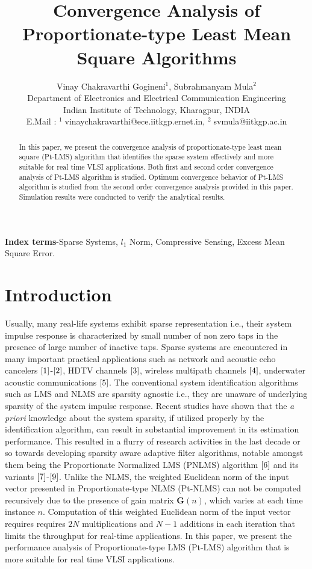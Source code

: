 \documentclass[journal, one column]{IEEEtran}
\begin{document}
\title{Convergence Analysis of Proportionate-type Least Mean Square Algorithms}


\author{{Vinay Chakravarthi Gogineni$^1$, Subrahmanyam Mula$^2$}\\
Department of Electronics and Electrical Communication Engineering\\
Indian Institute of Technology, Kharagpur, INDIA\\
E.Mail : $^1\;$vinaychakravarthi@ece.iitkgp.ernet.in, $^2\;$svmula@iitkgp.ac.in}

\maketitle
\thispagestyle{empty}

\begin{abstract}
In this paper, we present the convergence analysis of proportionate-type least mean square (Pt-LMS) algorithm that identifies the sparse system effectively and more suitable for real time VLSI applications. Both first and second order convergence analysis of Pt-LMS algorithm is studied. Optimum convergence behavior of Pt-LMS algorithm is studied from the second order convergence analysis provided in this paper. Simulation results were conducted to verify the analytical results.
\end{abstract}
\textbf{Index terms}-Sparse Systems, $l_{1}$ Norm, Compressive Sensing, Excess Mean Square Error.
\section{Introduction}
Usually, many real-life systems exhibit sparse representation
i.e., their system impulse response is characterized by small
number of non zero taps in the presence of large number of
inactive taps. Sparse systems are encountered in many important
practical applications such as network and acoustic echo
cancelers $\cite{1}$-$\cite{2}$, HDTV channels $\cite{3}$,
wireless multipath channels $\cite{4}$, underwater acoustic
communications $\cite{5}$. The conventional
system identification algorithms such as LMS and NLMS
are sparsity agnostic i.e., they are unaware of
underlying sparsity of the system impulse response.  Recent
studies have shown that the \emph{a priori} knowledge about the
system sparsity, if utilized properly by the identification
algorithm, can result in substantial improvement in its estimation
performance. This resulted in a flurry of research activities in
the last decade or so towards developing sparsity aware adaptive
filter algorithms, notable amongst them being the Proportionate
Normalized LMS (PNLMS) algorithm $\cite{6}$ and its variants
$\cite{7}$-$\cite{9}$. Unlike the NLMS, the weighted Euclidean norm of the input vector presented in Proportionate-type NLMS (Pt-NLMS) can not be computed recursively due to the presence of gain matrix $\textbf{G}(n)$, which varies at each time instance $n$. Computation of this weighted Euclidean norm of the input vector requires requires $2N$ multiplications and $N-1$ additions in each iteration that limits the throughput for real-time applications. In this paper, we present the performance analysis of Proportionate-type LMS (Pt-LMS) algorithm that is more suitable for real time VLSI applications.
\end{document}
